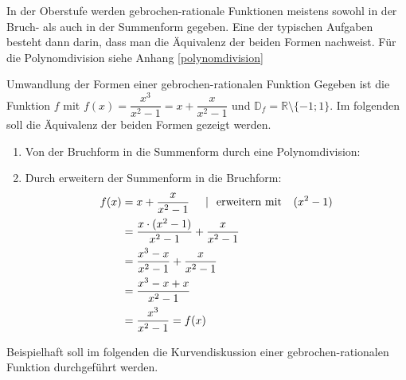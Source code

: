  In der Oberstufe werden gebrochen-rationale Funktionen meistens sowohl in der Bruch- als auch in der Summenform gegeben. Eine der typischen Aufgaben besteht dann darin, dass man die Äquivalenz der beiden Formen nachweist. Für die Polynomdivision siehe Anhang \ref{polynomdivision}  
 \begin{bsp}{Umwandlung der Formen einer gebrochen-rationalen Funktion}{}
Gegeben ist die Funktion $f$ mit $f(x) = \dfrac{x^3}{x^2-1} = x+ \dfrac{x}{x^2-1}$ und $\mathds{D}_f = \mathds{R}\setminus\{-1; 1\}$. Im folgenden soll die Äquivalenz der beiden Formen gezeigt werden.
\begin{enumerate}
    \item Von der Bruchform in die Summenform durch eine Polynomdivision:\\ 
    \item Durch erweitern der Summenform in die Bruchform: 
\begin{equation*}
    \begin{split}
        f(x) &= x+\dfrac{x}{x^2-1} \hspace{0.5cm} |\hspace{0.25cm} \text{erweitern mit } \hspace{0.25cm} (x^2-1)\\
        &= \dfrac{x\cdot (x^2-1)}{x^2-1} + \dfrac{x}{x^2-1}\\
        &= \dfrac{x^3-x}{x^2-1} + \dfrac{x}{x^2-1}\\
        &= \dfrac{x^3-x+x}{x^2-1} \\
        &= \dfrac{x^3}{x^2-1} = f(x)
    \end{split}
\end{equation*}
\end{enumerate}
\end{bsp}
 Beispielhaft soll im folgenden die Kurvendiskussion einer gebrochen-rationalen Funktion durchgeführt werden. 
